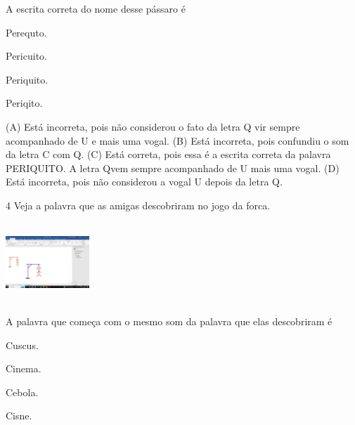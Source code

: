 
A escrita correta do nome desse pássaro é

\begin{minipage}{.5\textwidth}
\begin{escolha}
\item Perequto.

\item Pericuito.

\item Periquito.

\item Periqito.
\end{escolha}
\end{minipage}

(A) Está incorreta, pois não considerou o fato da letra Q vir sempre
acompanhado de U e mais uma vogal.
(B) Está incorreta, pois confundiu o som da letra C com Q.
(C) Está correta, pois essa é a escrita correta da palavra PERIQUITO. A
letra Qvem sempre acompanhado de U mais uma vogal.
(D) Está incorreta, pois não considerou a vogal U depois da letra Q.

\num{4} Veja a palavra que as amigas descobriram no jogo da forca.

\includegraphics[width=1.24236in,height=1.17500in]{media/image166.png}

A palavra que começa com o mesmo som da palavra que elas descobriram é

\begin{minipage}{.5\textwidth}
\begin{escolha}
\item Cuscus.

\item Cinema.

\item Cebola.

\item Cisne.
\end{escolha}
\end{minipage}

